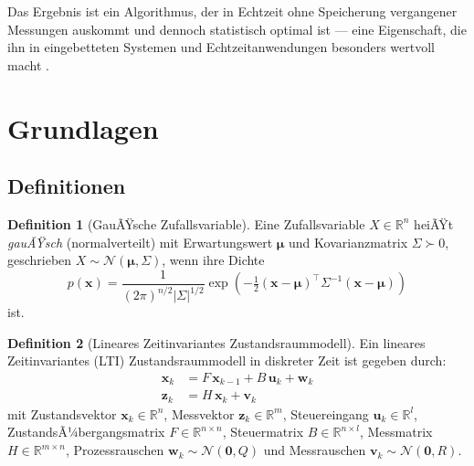 ﻿\documentclass[a4paper,12pt]{article}
\theoremstyle{definition}
\newtheorem{definition}{Definition}
\begin{document}
Das Ergebnis ist ein Algorithmus, der in Echtzeit ohne Speicherung vergangener Messungen
auskommt und dennoch statistisch optimal ist --- eine Eigenschaft, die ihn in
eingebetteten Systemen und Echtzeitanwendungen besonders wertvoll macht \cite{welch1995,bar2004}.

\section{Grundlagen}

\subsection{Definitionen}

\begin{definition}[GauÃŸsche Zufallsvariable]
    Eine Zufallsvariable $X \in \mathbb{R}^n$ heiÃŸt \emph{gauÃŸsch} (normalverteilt) mit
    Erwartungswert $\boldsymbol{\mu}$ und Kovarianzmatrix $\Sigma \succ 0$, geschrieben
    $X \sim \mathcal{N}(\boldsymbol{\mu}, \Sigma)$, wenn ihre Dichte
    \[
        p(\mathbf{x}) = \frac{1}{(2\pi)^{n/2} |\Sigma|^{1/2}}
        \exp\!\left(-\tfrac{1}{2}(\mathbf{x}-\boldsymbol{\mu})^\top \Sigma^{-1}
        (\mathbf{x}-\boldsymbol{\mu})\right)
    \]
    ist.
\end{definition}

\begin{definition}[Lineares Zeitinvariantes Zustandsraummodell]
\label{def:lti}
    Ein lineares Zeitinvariantes (LTI) Zustandsraummodell in diskreter Zeit ist gegeben durch:
    \begin{align}
        \mathbf{x}_k &= F\,\mathbf{x}_{k-1} + B\,\mathbf{u}_k + \mathbf{w}_k
            \label{eq:proc} \\
        \mathbf{z}_k &= H\,\mathbf{x}_k + \mathbf{v}_k
            \label{eq:meas}
    \end{align}
    mit Zustandsvektor $\mathbf{x}_k \in \mathbb{R}^n$,
    Messvektor $\mathbf{z}_k \in \mathbb{R}^m$,
    Steuereingang $\mathbf{u}_k \in \mathbb{R}^l$,
    ZustandsÃ¼bergangsmatrix $F \in \mathbb{R}^{n \times n}$,
    Steuermatrix $B \in \mathbb{R}^{n \times l}$,
    Messmatrix $H \in \mathbb{R}^{m \times n}$,
    Prozessrauschen $\mathbf{w}_k \sim \mathcal{N}(\mathbf{0}, Q)$ und
    Messrauschen $\mathbf{v}_k \sim \mathcal{N}(\mathbf{0}, R)$.
\end{definition}
\end{document}
